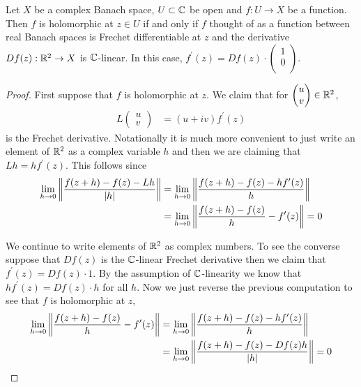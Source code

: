 \begin{prop}\label{banach:HolomorphicFrechet} Let $X$ be a complex Banach space, $U \subset
  \mathbb{C}$ be open and $f : U \to X$ be a function.  Then $f$ is
  holomorphic at $z \in U$ if and only if $f$ thought of as a function
  between real Banach spaces is Frechet differentiable at $z$ and the
  derivative $Df(z) : \mathbb{R}^2 \to X$ is $\mathbb{C}$-linear.   In this case, $f^\prime(z) = Df(z) \cdot \begin{pmatrix} 1 \\ 0 \\ \end{pmatrix}$.
\end{prop}
\begin{proof}
  First suppose that $f$ is holomorphic at $z$.   We claim that for
  $\begin{pmatrix} u \\ v \end{pmatrix} \in \mathbb{R}^2$,
  \begin{align*}
    L \begin{pmatrix} u \\ v \end{pmatrix} &= \left(u + iv\right)
                                                 f^\prime(z)
  \end{align*}
  is the Frechet derivative.  Notationally it is much more convenient
  to just write an element of $\mathbb{R}^2$ as a complex variable $h$ and then we are
  claiming that $L h = h f^\prime(z)$.   This follows since
  \begin{align*}
    \lim_{h \to 0} \left \lVert \frac{f(z + h) - f(z) - Lh}{\left \vert h \right \vert} \right \rVert
    &= \lim_{h \to 0} \left \lVert \frac{f(z + h) - f(z) - hf^\prime(z)}{h} \right \rVert \\
    &= \lim_{h \to 0} \left \lVert \frac{f(z + h) - f(z)}{h} - f^\prime(z) \right \rVert = 0
  \end{align*}

We continue to write elements of $\mathbb{R}^2$ as complex numbers.   To see the converse suppose that $Df(z)$ is the $\mathbb{C}$-linear Frechet derivative
then we claim that $f^\prime(z) = Df(z) \cdot 1$.   By the assumption of $\mathbb{C}$-linearity we know that $h f^\prime(z) = Df(z) \cdot h$ for all $h$.   Now we just
reverse the previous computation to see that $f$ is holomorphic at $z$,
 \begin{align*}
   \lim_{h \to 0} \left \lVert \frac{f(z + h) - f(z)}{h} - f^\prime(z) \right \rVert 
    &= \lim_{h \to 0} \left \lVert \frac{f(z + h) - f(z) - hf^\prime(z)}{h} \right \rVert \\
    &=\lim_{h \to 0} \left \lVert \frac{f(z + h) - f(z) - Df(z) h}{\left \vert h \right \vert} \right \rVert = 0
  \end{align*}
\end{proof}

